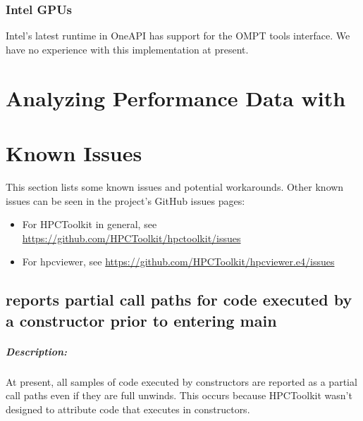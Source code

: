 \documentclass[11pt,twoside,letterpaper]{report}
\begin{document}
\subsection{Intel GPUs}
Intel's latest runtime in OneAPI has support for the OMPT tools interface.
We have no experience with this implementation at present.



\cleardoublepage
\chapter{Analyzing Performance Data with \hpcviewer{}}
\label{chpt:hpcviewer-interface}









\cleardoublepage
\chapter{Known Issues}
\label{chpt:known}

This section lists some known issues and potential workarounds. 
Other known issues can be seen in the project's GitHub issues pages: 
\begin{itemize}
 \item For HPCToolkit in general, see  \url{https://github.com/HPCToolkit/hpctoolkit/issues}
 \item For hpcviewer, see \url{https://github.com/HPCToolkit/hpcviewer.e4/issues}
\end{itemize}

\section{\hpcrun{} reports partial call paths for code executed by a constructor prior to entering main}

\paragraph{Description:} At present, all samples of code executed by constructors are reported as a partial call paths even if they are full unwinds. This occurs because HPCToolkit wasn't designed to attribute code that executes in constructors. 
\end{document}
